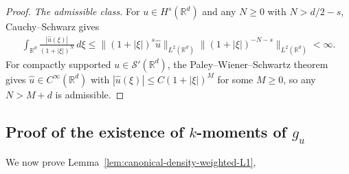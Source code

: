 \documentclass[12pt]{article}
\numberwithin{equation}{section}
\numberwithin{figure}{section}
\numberwithin{equation}{section}
\begin{document}
\begin{proof}
\emph{The admissible class.} For $u\in H^{s}(\mathbb R^d)$ and any $N\ge0$ with $N>d/2-s$,
Cauchy--Schwarz gives
\begin{align*}
    \int_{\mathbb R^d}\frac{|\widehat u(\xi)|}{(1+|\xi|)^{N}}\,d\xi
    \le\bigl\|(1+|\xi|)^{s}\widehat u\bigr\|_{L^2(\mathbb R^d)}
      \bigl\|(1+|\xi|)^{-N-s}\bigr\|_{L^2(\mathbb R^d)}<\infty .
\end{align*}
For compactly supported $u\in\mathcal S'(\mathbb R^d)$, the Paley--Wiener--Schwartz
theorem~\cite{friedlander_IntroductionTheoryDistributions_2003} gives
$\widehat u\in C^\infty(\mathbb R^d)$ with $|\widehat u(\xi)|\le C(1+|\xi|)^{M}$ for some
$M\ge0$, so any $N>M+d$ is admissible.
\end{proof}

\subsection{Proof of the existence of \texorpdfstring{$k$}{k}-moments
of \texorpdfstring{$g_u$}{g_u}}\label{app:proof-of-k-moments}
We now prove Lemma~\ref{lem:canonical-density-weighted-L1},
\end{document}
